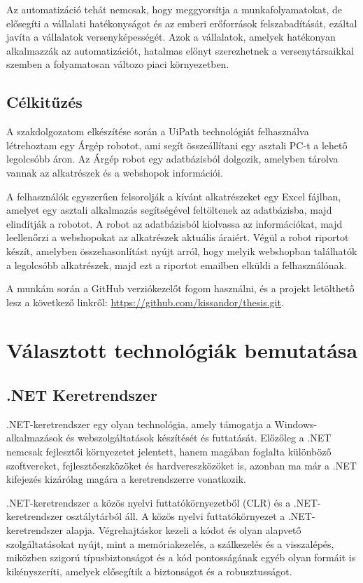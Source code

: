 \documentclass[
]{thesis-ekf}
\theoremstyle{definition}
\theoremstyle{remark}
\begin{document}
Az automatizáció tehát nemcsak, hogy meggyorsítja a munkafolyamatokat, de elősegíti a vállalati hatékonyságot és az emberi erőforrások felszabadítását,  ezáltal javíta a vállalatok versenyképességét. Azok a vállalatok, amelyek hatékonyan alkalmazzák az automatizációt, hatalmas előnyt szerezhetnek a versenytársaikkal szemben a folyamatosan változo piaci környezetben.


\section*{Célkitűzés}
A szakdolgozatom elkészítése során a UiPath technológiát felhasználva létrehoztam egy Árgép robotot, ami segít összeállítani egy asztali PC-t a lehető legolcsóbb áron. Az Árgép robot egy adatbázisból dolgozik, amelyben tárolva vannak az alkatrészek és a webshopok információi. 

A felhasználók egyszerűen felsorolják a kívánt alkatrészeket egy Excel fájlban, amelyet egy asztali alkalmazás segítségével feltöltenek az adatbázisba, majd elindítják a robotot. A robot az adatbázisból kiolvassa az információkat, majd leellenőrzi a webshopokat az alkatrészek aktuális áraiért. Végül a robot riportot készít, amelyben összehasonlítást nyújt arról, hogy melyik webshopban találhatók a legolcsóbb alkatrészek, majd ezt a riportot emailben elküldi a felhasználónak.

A munkám során a GitHub verziókezelőt fogom használni, és a projekt letölthető lesz a következő linkről: \url{https://github.com/kissandor/thesis.git}.


\chapter{Választott technológiák bemutatása}
\section{.NET Keretrendszer \cite{.NET}}
.NET-keretrendszer egy olyan technológia, amely támogatja a Windows-alkalmazások és webszolgáltatások készítését és futtatását. Előzőleg a .NET nemcsak fejlesztői környezetet jelentett, hanem magában foglalta különböző szoftvereket, fejlesztőeszközöket és hardvereszközöket is, azonban ma már a .NET kifejezés kizárólag magára a keretrendszerre vonatkozik.

.NET-keretrendszer a közös nyelvi futtatókörnyezetből (CLR) és a .NET- keretrendszer osztálytárból áll. A közös nyelvi futtatókörnyezet a .NET- keretrendszer alapja. Végrehajtáskor kezeli a kódot és olyan alapvető szolgáltatásokat nyújt, mint a memóriakezelés, a szálkezelés és a visszalépés, miközben szigorú típusbiztonságot és a kód pontosságának egyéb olyan formáit is kikényszeríti, amelyek elősegítik a biztonságot és a robusztusságot.
\end{document}

